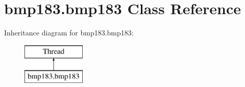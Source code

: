 \hypertarget{classbmp183_1_1bmp183}{}\section{bmp183.\+bmp183 Class Reference}
\label{classbmp183_1_1bmp183}
Inheritance diagram for bmp183.\+bmp183\+:\begin{figure}[H]
\begin{center}
\leavevmode
\includegraphics[height=2.000000cm]{classbmp183_1_1bmp183}
\end{center}
\end{figure}
